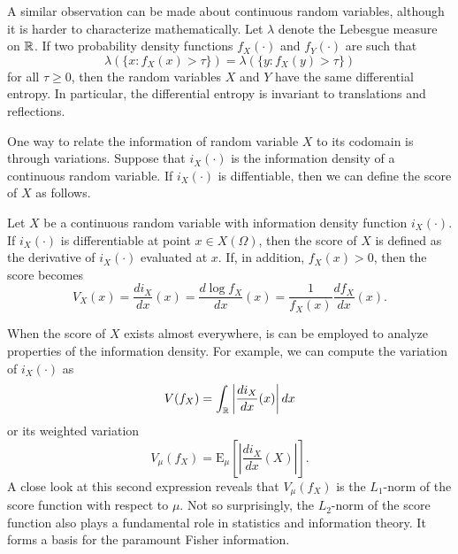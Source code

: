 A similar observation can be made about continuous random variables, although it is harder to characterize mathematically.
Let $\lambda$ denote the Lebesgue measure on $\mathbb{R}$.
If two probability density functions $f_X (\cdot)$ and $f_Y (\cdot)$ are such that
\begin{equation*}
\lambda ( \{ x : f_X (x) > \tau \} )
= \lambda ( \{ y : f_X (y) > \tau \} )
\end{equation*}
for all $\tau \geq 0$, then the random variables $X$ and $Y$ have the same differential entropy.
In particular, the differential entropy is invariant to translations and reflections.

One way to relate the information of random variable $X$ to its codomain is through variations.
Suppose that $i_X (\cdot)$ is the information density of a continuous random variable.
If $i_X (\cdot)$ is diffentiable, then we can define the score of $X$ as follows.

\begin{definition}[Score] \label{definition:ScoreX}
Let $X$ be a continuous random variable with information density function $i_X (\cdot)$.
If $i_X(\cdot)$ is differentiable at point $x \in X(\Omega)$, then the score of $X$ is defined as the derivative of $i_X(\cdot)$ evaluated at $x$.
If, in addition, $f_X (x) > 0$, then the score becomes
\begin{equation} \label{equation:ScoreX}
V_X (x) = \frac{d i_X}{dx} (x) = \frac{d \log f_X}{dx} (x) = \frac{1}{f_X (x)} \frac{d f_X}{dx} (x) .
\end{equation}
\end{definition}

When the score of $X$ exists almost everywhere, is can be employed to analyze properties of the information density.
For example, we can compute the variation of $i_X (\cdot)$ as
\begin{equation*}
V (f_X) = \int_{\mathbb{R}} \left| \frac{d i_X}{dx} (x) \right| dx
\end{equation*}
or its weighted variation
\begin{equation*}
V_{\mu} (f_X) = \mathrm{E}_{\mu} \left[ \left| \frac{d i_X}{dx} (X) \right| \right] .
\end{equation*}
A close look at this second expression reveals that $V_{\mu} (f_X)$ is the $L_1$-norm of the score function with respect to $\mu$.
Not so surprisingly, the $L_2$-norm of the score function also plays a fundamental role in statistics and information theory.
It forms a basis for the paramount Fisher information.

